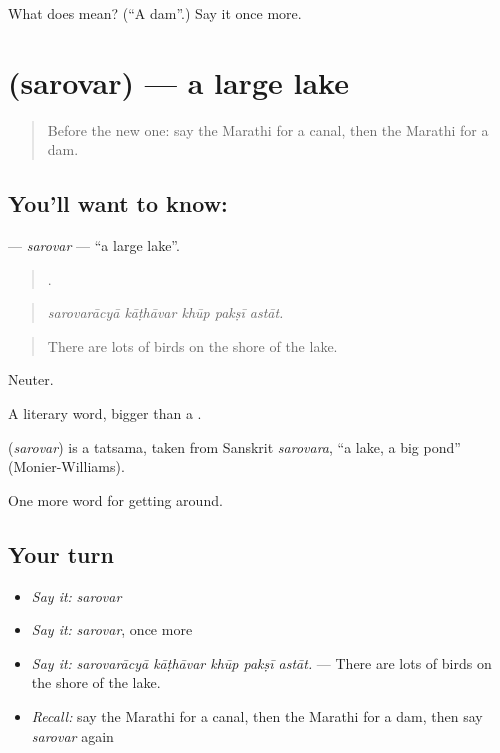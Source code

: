 \begin{tcolorbox}[breakable,colback=teal!4,colframe=teal!35!black,title={Before you move on}]
What does  mean? (\textquotedblleft{}A dam\textquotedblright{}.) Say it once more.
\end{tcolorbox}
\section[\texorpdfstring{\mr{सरोवर} (sarovar)}{सरोवर (sarovar)}]{ (sarovar) — a large lake}

\label{lesson:MR-C443-sarovar}



\begin{quote}
Before the new one: say the Marathi for a canal, then the Marathi for a dam.
\end{quote}

\subsection*{You'll want to know: }
\textbf{} — \emph{sarovar} — \textquotedblleft{}a large lake\textquotedblright{}.

\begin{quote}
    .
\end{quote}

\begin{quote}
\emph{sarovarācyā kāṭhāvar khūp pakṣī astāt.}
\end{quote}

\begin{quote}
There are lots of birds on the shore of the lake.
\end{quote}

Neuter.

A literary word, bigger than a .

\begin{cousinweb}
\textbf{} (\emph{sarovar}) is a tatsama, taken from Sanskrit \emph{sarovara}, \textquotedblleft{}a lake, a big pond\textquotedblright{} (Monier-Williams).
\end{cousinweb}

\begin{grammarlens}[title={What you've built}]
One more word for getting around.
\end{grammarlens}

\subsection*{Your turn}
\begin{itemize}
\raggedright
  \item \emph{Say it:} \emph{sarovar}
  \item \emph{Say it:} \emph{sarovar}, once more
  \item \emph{Say it:} \emph{sarovarācyā kāṭhāvar khūp pakṣī astāt.} — There are lots of birds on the shore of the lake.
  \item \emph{Recall:} say the Marathi for a canal, then the Marathi for a dam, then say \emph{sarovar} again
\end{itemize}

